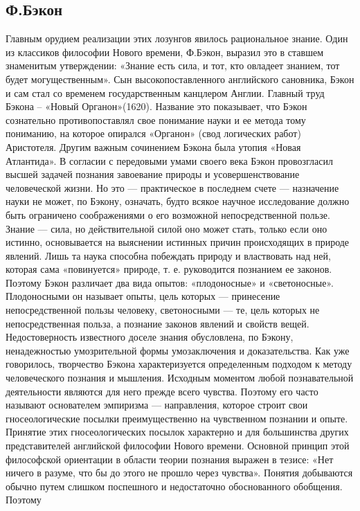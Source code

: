 \documentclass[12pt]{article}
\begin{document}
\subsection {Ф.Бэкон}
Главным
орудием реализации этих лозунгов явилось рациональное знание. Один из классиков философии Нового
времени,  Ф.Бэкон,  выразил  это  в  ставшем   знаменитым утверждении: «Знание есть сила, и  тот,  кто
овладеет знанием, тот будет могущественным».
Сын высокопоставленного английского сановника, Бэкон и сам стал со временем государственным канцлером
Англии. Главный  труд  Бэкона  – «Новый Органон»(1620).  Название это показывает, что  Бэкон сознательно
противопоставлял свое понимание науки и ее метода тому пониманию, на которое опирался «Органон» (свод
логических работ) Аристотеля. Другим важным сочинением Бэкона была утопия «Новая Атлантида».
В согласии с передовыми умами своего века Бэкон провозгласил высшей задачей познания завоевание природы
и усовершенствование человеческой жизни. Но это — практическое в последнем счете — назначение науки не
может, по Бэкону, означать, будто всякое научное исследование должно быть ограничено соображениями о его
возможной непосредственной пользе. Знание — сила, но действительной силой оно может стать, только если
оно истинно, основывается на выяснении истинных причин происходящих в природе явлений. Лишь та наука
способна побеждать природу и властвовать над ней, которая сама «повинуется» природе, т. е. руководится
познанием ее законов.
Поэтому Бэкон различает два вида опытов: «плодоносные» и «светоносные». Плодоносными он называет
опыты, цель которых — принесение непосредственной пользы человеку, светоносными — те, цель которых
не   непосредственная   польза,  а познание законов явлений и свойств вещей. Недостоверность известного
доселе знания обусловлена, по Бэкону, ненадежностью умозрительной формы умозаключения и доказательства.
Как  уже  говорилось,  творчество  Бэкона  характеризуется  определенным  подходом  к  методу  человеческого
познания и мышления. Исходным моментом любой познавательной деятельности являются для него прежде
всего  чувства.  Поэтому  его  часто  называют  основателем  эмпиризма  —  направления,  которое  строит  свои
гносеологические  посылки  преимущественно  на  чувственном  познании  и  опыте.  Принятие  этих
гносеологических  посылок  характерно  и  для  большинства  других  представителей  английской  философии
Нового времени. Основной принцип этой философской ориентации в области теории познания выражен в тезисе:
«Нет ничего в разуме, что бы до этого не прошло через чувства».
Понятия добываются обычно путем слишком поспешного и недостаточно обоснованного обобщения. Поэтому
\end{document}
